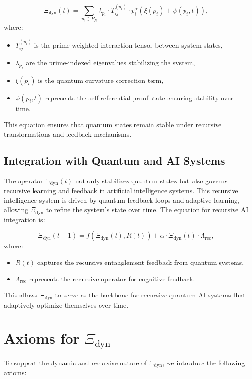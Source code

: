 \documentclass{article}
\theoremstyle{plain}
\begin{document}
\begin{itemize}
\[
\Xi_{\text{dyn}}(t) = \sum_{p_i \in P_N} \lambda_{p_i} \cdot T_{ij}^{(p_i)} \cdot p_i^{\alpha} \left( \xi(p_i) + \psi(p_i, t) \right),
\]
where:
\begin{itemize}
    \item $T_{ij}^{(p_i)}$ is the prime-weighted interaction tensor between system states,
    \item $\lambda_{p_i}$ are the prime-indexed eigenvalues stabilizing the system,
    \item $\xi(p_i)$ is the quantum curvature correction term,
    \item $\psi(p_i, t)$ represents the self-referential proof state ensuring stability over time.
\end{itemize}

This equation ensures that quantum states remain stable under recursive transformations and feedback mechanisms.

\subsection{Integration with Quantum and AI Systems}
The operator $\Xi_{\text{dyn}}(t)$ not only stabilizes quantum states but also governs recursive learning and feedback in artificial intelligence systems. This recursive intelligence system is driven by quantum feedback loops and adaptive learning, allowing $\Xi_{\text{dyn}}$ to refine the system's state over time. The equation for recursive AI integration is:

\[
\Xi_{\text{dyn}}(t+1) = f(\Xi_{\text{dyn}}(t), R(t)) + \alpha \cdot \Xi_{\text{dyn}}(t) \cdot \Lambda_{\text{rec}},
\]
where:
\begin{itemize}
    \item $R(t)$ captures the recursive entanglement feedback from quantum systems,
    \item $\Lambda_{\text{rec}}$ represents the recursive operator for cognitive feedback.
\end{itemize}

This allows $\Xi_{\text{dyn}}$ to serve as the backbone for recursive quantum-AI systems that adaptively optimize themselves over time.

\section{Axioms for $\Xi_{\text{dyn}}$}
To support the dynamic and recursive nature of $\Xi_{\text{dyn}}$, we introduce the following axioms:


\end{itemize}
\end{document}
